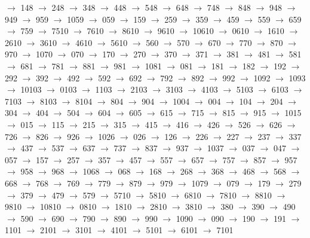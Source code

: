 $\rightarrow$ 148 $\rightarrow$ 248 $\rightarrow$ 348 $\rightarrow$ 448 $\rightarrow$ 548 $\rightarrow$ 648 $\rightarrow$ 748 $\rightarrow$ 848 $\rightarrow$ 948 $\rightarrow$ 949 $\rightarrow$ 959 $\rightarrow$ 1059 $\rightarrow$ 059 $\rightarrow$ 159 $\rightarrow$ 259 $\rightarrow$ 359 $\rightarrow$ 459 $\rightarrow$ 559 $\rightarrow$ 659 $\rightarrow$ 759 $\rightarrow$ 7510 $\rightarrow$ 7610 $\rightarrow$ 8610 $\rightarrow$ 9610 $\rightarrow$ 10610 $\rightarrow$ 0610 $\rightarrow$ 1610 $\rightarrow$ 2610 $\rightarrow$ 3610 $\rightarrow$ 4610 $\rightarrow$ 5610 $\rightarrow$ 560 $\rightarrow$ 570 $\rightarrow$ 670 $\rightarrow$ 770 $\rightarrow$ 870 $\rightarrow$ 970 $\rightarrow$ 1070 $\rightarrow$ 070 $\rightarrow$ 170 $\rightarrow$ 270 $\rightarrow$ 370 $\rightarrow$ 371 $\rightarrow$ 381 $\rightarrow$ 481 $\rightarrow$ 581 $\rightarrow$ 681 $\rightarrow$ 781 $\rightarrow$ 881 $\rightarrow$ 981 $\rightarrow$ 1081 $\rightarrow$ 081 $\rightarrow$ 181 $\rightarrow$ 182 $\rightarrow$ 192 $\rightarrow$ 292 $\rightarrow$ 392 $\rightarrow$ 492 $\rightarrow$ 592 $\rightarrow$ 692 $\rightarrow$ 792 $\rightarrow$ 892 $\rightarrow$ 992 $\rightarrow$ 1092 $\rightarrow$ 1093 $\rightarrow$ 10103 $\rightarrow$ 0103 $\rightarrow$ 1103 $\rightarrow$ 2103 $\rightarrow$ 3103 $\rightarrow$ 4103 $\rightarrow$ 5103 $\rightarrow$ 6103 $\rightarrow$ 7103 $\rightarrow$ 8103 $\rightarrow$ 8104 $\rightarrow$ 804 $\rightarrow$ 904 $\rightarrow$ 1004 $\rightarrow$ 004 $\rightarrow$ 104 $\rightarrow$ 204 $\rightarrow$ 304 $\rightarrow$ 404 $\rightarrow$ 504 $\rightarrow$ 604 $\rightarrow$ 605 $\rightarrow$ 615 $\rightarrow$ 715 $\rightarrow$ 815 $\rightarrow$ 915 $\rightarrow$ 1015 $\rightarrow$ 015 $\rightarrow$ 115 $\rightarrow$ 215 $\rightarrow$ 315 $\rightarrow$ 415 $\rightarrow$ 416 $\rightarrow$ 426 $\rightarrow$ 526 $\rightarrow$ 626 $\rightarrow$ 726 $\rightarrow$ 826 $\rightarrow$ 926 $\rightarrow$ 1026 $\rightarrow$ 026 $\rightarrow$ 126 $\rightarrow$ 226 $\rightarrow$ 227 $\rightarrow$ 237 $\rightarrow$ 337 $\rightarrow$ 437 $\rightarrow$ 537 $\rightarrow$ 637 $\rightarrow$ 737 $\rightarrow$ 837 $\rightarrow$ 937 $\rightarrow$ 1037 $\rightarrow$ 037 $\rightarrow$ 047 $\rightarrow$ 057 $\rightarrow$ 157 $\rightarrow$ 257 $\rightarrow$ 357 $\rightarrow$ 457 $\rightarrow$ 557 $\rightarrow$ 657 $\rightarrow$ 757 $\rightarrow$ 857 $\rightarrow$ 957 $\rightarrow$ 958 $\rightarrow$ 968 $\rightarrow$ 1068 $\rightarrow$ 068 $\rightarrow$ 168 $\rightarrow$ 268 $\rightarrow$ 368 $\rightarrow$ 468 $\rightarrow$ 568 $\rightarrow$ 668 $\rightarrow$ 768 $\rightarrow$ 769 $\rightarrow$ 779 $\rightarrow$ 879 $\rightarrow$ 979 $\rightarrow$ 1079 $\rightarrow$ 079 $\rightarrow$ 179 $\rightarrow$ 279 $\rightarrow$ 379 $\rightarrow$ 479 $\rightarrow$ 579 $\rightarrow$ 5710 $\rightarrow$ 5810 $\rightarrow$ 6810 $\rightarrow$ 7810 $\rightarrow$ 8810 $\rightarrow$ 9810 $\rightarrow$ 10810 $\rightarrow$ 0810 $\rightarrow$ 1810 $\rightarrow$ 2810 $\rightarrow$ 3810 $\rightarrow$ 380 $\rightarrow$ 390 $\rightarrow$ 490 $\rightarrow$ 590 $\rightarrow$ 690 $\rightarrow$ 790 $\rightarrow$ 890 $\rightarrow$ 990 $\rightarrow$ 1090 $\rightarrow$ 090 $\rightarrow$ 190 $\rightarrow$ 191 $\rightarrow$ 1101 $\rightarrow$ 2101 $\rightarrow$ 3101 $\rightarrow$ 4101 $\rightarrow$ 5101 $\rightarrow$ 6101 $\rightarrow$ 7101 